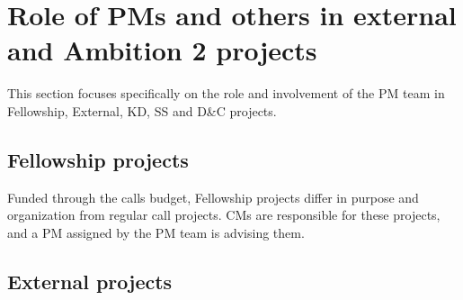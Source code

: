 \section{Role of PMs and others in external and Ambition 2 projects}
\label{app:pm-role}

This section focuses specifically on the role and involvement of the PM team in Fellowship,
External, KD, SS and D\&C projects.


\subsection{Fellowship projects}
Funded through the calls budget, Fellowship projects differ in purpose and organization from regular 
call projects. CMs are responsible for these projects, and a PM assigned by the PM team is advising them.

\subsection{External projects}


